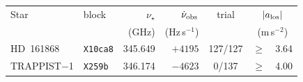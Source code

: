\begin{tabular}{@{}llr@{~}r@{~}c@{~}r@{~}l@{}}
\hline
Star & block & $\nu_\star$ & $\dot\nu_{\rm obs}$ & trial & \multicolumn{2}{c}{$|a_{\rm los}|$} \\
 & & (GHz) & (Hz\,s$^{-1}$) & & \multicolumn{2}{c}{(m\,s$^{-2}$)} \\
\hline
HD~161868 & \texttt{X10ca8} & 345.649 & $+4195$ & 127/127 & $\ge$ & 3.64 \\
TRAPPIST$-$1 & \texttt{X259b} & 346.174 & $-4623$ & 0/137 & $\ge$ & 4.00 \\
\hline
\end{tabular}
